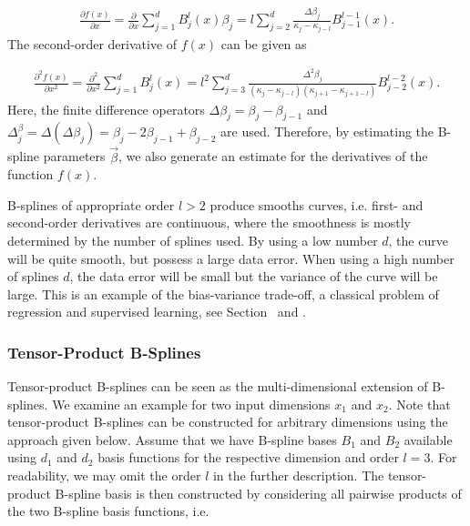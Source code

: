 \begin{align} \label{eq:Bspline-derivative}
	\frac{\partial{f(x)}}{\partial x}= \frac{\partial}{\partial x} \sum_{j=1}^d B_j^l(x) \beta_j = l \sum_{j=2}^d \frac{\Delta \beta_j}{\kappa_j - \kappa_{j-l}} B_{j-1}^{l-1}(x).
\end{align}
%
The second-order derivative of $f(x)$ can be given as

\begin{align} \label{eq:Bspline-2nd-derivative}
	\frac{\partial^2 {f(x)}}{\partial{x^2}}= \frac{\partial^2}{\partial{x^2}} \sum_{j=1}^d B_j^l(x) = l^2 \sum_{j=3}^d \frac{\Delta^2 \beta_j}{(\kappa_j-\kappa_{j-l})(\kappa_{j+1} - \kappa_{j+1-l})} B_{j-2}^{l-2}(x).
\end{align}
%
Here, the finite difference operators $\Delta \beta_j = \beta_j - \beta_{j-1}$ and $\Delta^ \beta_j = \Delta(\Delta \beta_j) = \beta_j - 2\beta_{j-1} +\beta_{j-2}$ are used. Therefore, by estimating the B-spline parameters $\vec{\beta}$, we also generate an estimate for the derivatives of the function $f(x)$. 

B-splines of appropriate order $l > 2$ produce smooths curves, i.e. first- and second-order derivatives are continuous, where the smoothness is mostly determined by the number of splines used. By using a low number $d$, the curve will be quite smooth, but possess a large data error. When using a high number of splines $d$, the data error will be small but the variance of the curve will be large. This is an example of the bias-variance trade-off, a classical problem of regression and supervised learning, see Section~ and \cite{deBoor1978practicalGuideToSplines}.  


\subsubsection{Tensor-Product B-Splines} \label{subsubsec:tp-splines}

Tensor-product B-splines can be seen as the multi-dimensional extension of B-splines. We examine an example for two input dimensions $x_1$ and $x_2$. Note that tensor-product B-splines can be constructed for arbitrary dimensions using the approach given below. Assume that we have B-spline bases $B_1$ and $B_2$ available using $d_1$ and $d_2$ basis functions for the respective dimension and order $l=3$. For readability, we may omit the order $l$ in the further description. The tensor-product B-spline basis is then constructed by considering all pairwise products of the two B-spline basis functions, i.e.

